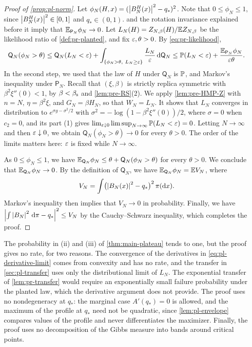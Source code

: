\begin{proof}[Proof of \cref{prop:pl-norm}]
Let $\phi_N(H,x)=(\left|B_N^H(x)\right|^2-q_*)^2$. Note that $0\le \phi_N\le1$, since $\left|B_N^H(x)\right|^2\in[0,1]$ and $q_*\in(0,1)$.  and the rotation invariance explained before it imply that $\mathbb E_{\mathsf P_N}\phi_N\to0$. Let $L_N(H)=Z_{N,\beta}(H)/\mathbb E Z_{N,\beta}$ be the likelihood ratio of \cref{def:pr-planted}, and fix $\varepsilon,\theta>0$. By \eqref{eq:pr-likelihood},
\[
\mathsf Q_N(\phi_N>\theta)\le\mathsf Q_N(L_N<\eps)+\int_{\{\phi_N>\theta,\ L_N\ge\eps\}}\frac{L_N}\eps\dd\mathsf Q_N
\le\Pp(L_N<\eps)+\frac{\E_{\mathsf P_N}\phi_N}{\eps\theta}.
\]
In the second step, we used that the law of $H$ under $\mathsf Q_N$ is $\mathbb P$, and Markov's inequality under $\mathsf P_N$. Recall that $(\xi,\beta)$ is strictly replica symmetric with $\beta^2\xi''(0)<1$, by $\beta<\beta_{\mathrm s}$ and \cref{lem:pre-RS}(2). We apply \cref{lem:pre-HMP-Z} with $n=N$, $\eta=\beta^2\xi$, and $G_N=\beta H_N$, so that $W_N=L_N$. It shows that $L_N$ converges in distribution to $e^{\sigma g-\sigma^2/2}$ with $\sigma^2=-\log(1-\beta^2\xi''(0))/2$, where $\sigma=0$ when $c_2=0$, and its part (1) gives $\lim_{\varepsilon\downarrow0}\limsup_{N\to\infty}\mathbb P(L_N<\varepsilon)=0$. Letting $N\to\infty$ and then $\varepsilon\downarrow0$, we obtain $\mathsf Q_N(\phi_N>\theta)\to0$ for every $\theta>0$. The order of the limits matters here: $\varepsilon$ is fixed while $N\to\infty$.

As $0\le \phi_N\le1$, we have $\mathbb E_{\mathsf Q_N}\phi_N\le\theta+\mathsf Q_N(\phi_N>\theta)$ for every $\theta>0$. We conclude that $\mathbb E_{\mathsf Q_N}\phi_N\to0$. By the definition of $\mathsf Q_N$, we have $\mathbb E_{\mathsf Q_N}\phi_N=\mathbb E V_N$, where
\[
V_N=\int\bigl(\left|B_N(x)\right|^2-q_*\bigr)^2\,\pi(\mathrm dx).
\]
Markov's inequality then implies that $V_N\to0$ in probability. Finally, we have $\left|\int\left|B_N\right|^2\,\mathrm d\pi-q_*\right|^2\le V_N$ by the Cauchy--Schwarz inequality, which completes the proof.
\end{proof}

\begin{remark}\label{rem:pl-scope}
The probability in (ii) and (iii) of \cref{thm:main-plateau} tends to one, but the proof gives no rate, for two reasons. The convergence of the derivatives in \eqref{eq:pl-derivative-limit} comes from convexity and has no rate, and the transfer in \cref{sec:pl-transfer} uses only the distributional limit of $L_N$. The exponential transfer of \cref{lem:pr-transfer} would require an exponentially small failure probability under the planted law, which the derivative argument does not provide. The proof uses no nondegeneracy at $q_*$: the marginal case $A'(q_*)=0$ is allowed, and the maximum of the profile at $q_*$ need not be quadratic, since \cref{lem:pl-envelope} compares values of the profile and never differentiates the maximizer. Finally, the proof uses no decomposition of the Gibbs measure into bands around critical points.
\end{remark}

